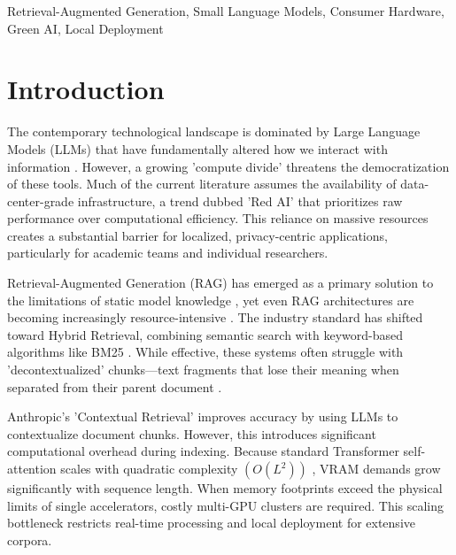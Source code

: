 \documentclass[conference]{IEEEtran}
\begin{document}
\begin{IEEEkeywords}
Retrieval-Augmented Generation, Small Language Models, Consumer Hardware, Green AI, Local Deployment 
\end{IEEEkeywords}

\section{Introduction}

The contemporary technological landscape is dominated by Large Language Models (LLMs) that have fundamentally altered how we interact with information \cite{bengioetal2003, zhu2025informationretrieval}. However, a growing 'compute divide' \cite{besiroglu2024computedividemachinelearning} threatens the democratization of these tools. Much of the current literature assumes the availability of data-center-grade infrastructure, a trend dubbed 'Red AI' \cite{schwartz2020green} that prioritizes raw performance over computational efficiency. This reliance on massive resources creates a substantial barrier for localized, privacy-centric applications, particularly for academic teams and individual researchers.

Retrieval-Augmented Generation (RAG) has emerged as a primary solution to the limitations of static model knowledge \cite{lewisetal2021, info16090766}, yet even RAG architectures are becoming increasingly resource-intensive \cite{shen2024RAGDesignTradeoffs}. The industry standard has shifted toward Hybrid Retrieval, combining semantic search with keyword-based algorithms like BM25 \cite{robertson1995okapi, kiran2025hybrid}. While effective, these systems often struggle with 'decontextualized' chunks—text fragments that lose their meaning when separated from their parent document \cite{merola2025reconstructingcontextevaluatingadvanced}.


Anthropic’s 'Contextual Retrieval' \cite{anthropic2024contextual} improves accuracy by using LLMs to contextualize document chunks. However, this introduces significant computational overhead during indexing. Because standard Transformer self-attention scales with quadratic complexity $(O(L^2))$ \cite{tay2022efficient}, VRAM demands grow significantly with sequence length. When memory footprints exceed the physical limits of single accelerators, costly multi-GPU clusters are required. This scaling bottleneck restricts real-time processing and local deployment for extensive corpora.
\end{document}
